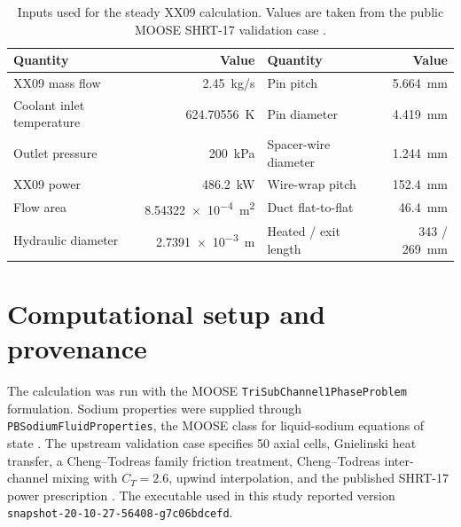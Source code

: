 \documentclass[10pt,a4paper]{article}
\begin{document}
\begin{table}[H]
\centering\small
\caption{Inputs used for the steady XX09 calculation. Values are taken from the public MOOSE SHRT-17 validation case \parencite{moose_ebrii}.}
\begin{tabular}{@{}lrlr@{}}
\toprule
Quantity & Value & Quantity & Value \\
\midrule
XX09 mass flow & \SI{2.45}{kg/s} & Pin pitch & \SI{5.664}{mm} \\
Coolant inlet temperature & \SI{624.70556}{K} & Pin diameter & \SI{4.419}{mm} \\
Outlet pressure & \SI{200}{kPa} & Spacer-wire diameter & \SI{1.244}{mm} \\
XX09 power & \SI{486.2}{kW} & Wire-wrap pitch & \SI{152.4}{mm} \\
Flow area & \SI{8.54322e-4}{m^2} & Duct flat-to-flat & \SI{46.4}{mm} \\
Hydraulic diameter & \SI{2.7391e-3}{m} & Heated / exit length & 343 / \SI{269}{mm} \\
\bottomrule
\end{tabular}
\end{table}

\section{Computational setup and provenance}

The calculation was run with the MOOSE \texttt{TriSubChannel1PhaseProblem} formulation. Sodium properties were supplied through \texttt{PBSodiumFluidProperties}, the MOOSE class for liquid-sodium equations of state \parencite{moose_pbsodium}. The upstream validation case specifies 50 axial cells, Gnielinski heat transfer, a Cheng--Todreas family friction treatment, Cheng--Todreas inter-channel mixing with $C_T=2.6$, upwind interpolation, and the published SHRT-17 power prescription \parencite{moose_ebrii,gnielinski1975}. The executable used in this study reported version \texttt{snapshot-20-10-27-56408-g7c06bdcefd}.
\end{document}
